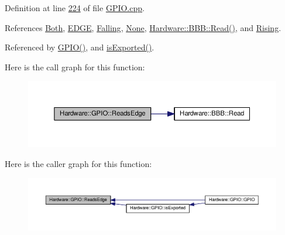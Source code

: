 Definition at line \hyperlink{_g_p_i_o_8cpp_source_l00224}{224} of file \hyperlink{_g_p_i_o_8cpp_source}{G\+P\+I\+O.\+cpp}.



References \hyperlink{_g_p_i_o_8h_source_l00029}{Both}, \hyperlink{_g_p_i_o_8h_source_l00020}{E\+D\+G\+E}, \hyperlink{_g_p_i_o_8h_source_l00029}{Falling}, \hyperlink{_g_p_i_o_8h_source_l00029}{None}, \hyperlink{_b_b_b_8cpp_source_l00026}{Hardware\+::\+B\+B\+B\+::\+Read()}, and \hyperlink{_g_p_i_o_8h_source_l00029}{Rising}.



Referenced by \hyperlink{_g_p_i_o_8cpp_source_l00011}{G\+P\+I\+O()}, and \hyperlink{_g_p_i_o_8cpp_source_l00089}{is\+Exported()}.



Here is the call graph for this function\+:
\nopagebreak
\begin{figure}[H]
\begin{center}
\leavevmode
\includegraphics[width=350pt]{class_hardware_1_1_g_p_i_o_ac5a3c6d1a0ce58a0b2ee0752623810e4_cgraph}
\end{center}
\end{figure}




Here is the caller graph for this function\+:
\nopagebreak
\begin{figure}[H]
\begin{center}
\leavevmode
\includegraphics[width=350pt]{class_hardware_1_1_g_p_i_o_ac5a3c6d1a0ce58a0b2ee0752623810e4_icgraph}
\end{center}
\end{figure}


\hypertarget{class_hardware_1_1_g_p_i_o_a2af76b35edfeae57ee5393f8455e2522}{}
